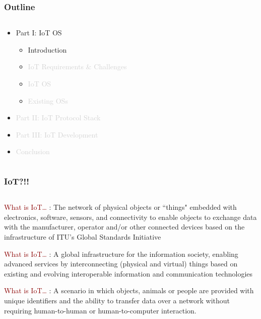\documentclass{beamer}
\begin{document}
\begin{frame}
	\frametitle{Outline}
	\begin{columns}[c]
		\begin{column}{30cm}
			\vspace{.1cm}
			\begin{itemize}
				\justifying
				\item Part I: IoT OS
				\begin{itemize}
					\item Introduction
					\item \textcolor{LightGray}{IoT Requirements \& Challenges}
					\item \textcolor{LightGray}{IoT OS}
					\item \textcolor{LightGray}{Existing OSs}
				\end{itemize}
				\item \textcolor{LightGray}{Part II: IoT Protocol Stack}
				\item \textcolor{LightGray}{Part III: IoT Development}
				\item \textcolor{LightGray}{Conclusion}
			\end{itemize}
		\end{column}
	\end{columns}
\end{frame}

\begin{frame}
	\frametitle{IoT?!!}
	\begin{columns}
		\begin{column}{12cm}
			\begin{block}{\centering\textcolor{darkred}{What is IoT\ldots}}
				\justifying
				[Wikipedia]: The network of physical objects or ``things" embedded with electronics, 	
				software, sensors, and connectivity to enable objects to exchange data with the
				manufacturer, operator and/or other connected devices based on the infrastructure of
				ITU's Global Standards Initiative
			\end{block}

			\begin{block}{\centering\textcolor{darkred}{What is IoT\ldots}}
				\justifying
				[ITU]: A global infrastructure for the information society, enabling advanced services
				by interconnecting (physical and virtual) things based on existing and evolving 		
				interoperable information and communication technologies
			\end{block}
			
			\begin{block}{\centering\textcolor{darkred}{What is IoT\ldots}}
				\justifying
				[WhatIs]: A scenario in which objects, animals or people are provided with unique
				identifiers and the ability to transfer data over a network without requiring 
				human-to-human or human-to-computer interaction.
			\end{block}
			
		\end{column}
	\end{columns}
\end{frame}
\end{document}
